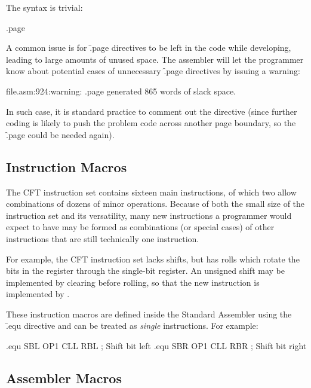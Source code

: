 The syntax is trivial:

\begin{cftasmcode}
.page
\end{cftasmcode}

A common issue is for \f{.page} directives to be left in the code while
developing, leading to large amounts of unused space. The assembler will let
the programmer know about potential cases of unnecessary \f{.page} directives
by issuing a warning:

\begin{intrcode}
file.asm:924:warning: .page generated 865 words of slack space.
\end{intrcode}

In such case, it is standard practice to comment out the directive (since
further coding is likely to push the problem code across another page boundary,
so the \f{.page} could be needed again).

\subsection{Instruction Macros}

The CFT instruction set contains sixteen main instructions, of which two allow
combinations of dozens of minor operations. Because of both the small size of
the instruction set and its versatility, many new instructions a programmer
would expect to have may be formed as combinations (or special cases) of other
instructions that are still technically one instruction.

For example, the CFT instruction set lacks shifts, but has rolls which rotate
the bits in the \AC{} register through the single-bit \Lreg{} register. An
unsigned shift may be implemented by clearing \Lreg{} before rolling, so that
the new instruction  is implemented by .

These instruction macros are defined inside the Standard Assembler using the
\f{.equ} directive and can be treated as {\em single} instructions. For example:

\begin{cftasmcode}
.equ   SBL   OP1 CLL RBL   ; Shift bit left
.equ   SBR   OP1 CLL RBR   ; Shift bit right
\end{cftasmcode}



\subsection{Assembler Macros}

